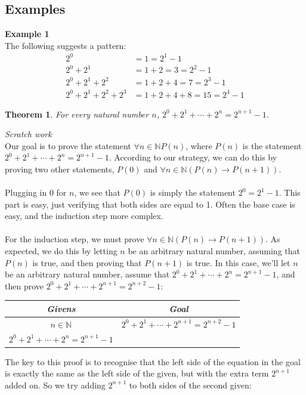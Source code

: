 \documentclass{report}
\newtheorem*{theorem}{Theorem}
\theoremstyle{definition}
\begin{document}
\subsection{Examples}
\textbf{Example 1}\\
The following suggests a pattern:
\begin{align*}
2^0&=1=2^1-1\\
2^0+2^1&=1+2=3=2^2-1\\
2^0+2^1+2^2&=1+2+4=7=2^3-1\\
2^0+2^1+2^2+2^3&=1+2+4+8=15=2^4-1
\end{align*}
\begin{theorem}
For every natural number $n$, $2^0+2^1+\cdots+2^n=2^{n+1}-1$.
\end{theorem}
\noindent\textit{Scratch work}\\
Our goal is to prove the statement $\forall n\in\mathbb NP(n)$, where $P(n)$ is the statement $2^0+2^1+\cdots+2^n=2^{n+1}-1$. According to our strategy, we can do this by proving two other
statements, $P(0)$ and $\forall n\in\mathbb N(P(n)\to P(n+1))$.\\
\vspace{1mm}\\
Plugging in 0 for $n$, we see that $P(0)$ is simply the statement $2^0=2^1-1$. This part is easy, just verifying that both sides are equal to 1. Often the base case is easy, and the induction 
step more complex.\\
\vspace{1mm}\\
For the induction step, we must prove $\forall n\in\mathbb N(P(n)\to P(n+1))$. As expected, we do this by letting $n$ be an arbitrary natural number, assuming that $P(n)$ is true, and then proving
that $P(n+1)$ is true. In this case, we'll let $n$ be an arbitrary natural number, assume that 
$2^0+2^1+\cdots+2^n=2^{n+1}-1$, and then prove $2^0+2^1+\cdots+2^{n+1}=2^{n+2}-1$:
\begin{center}
\begin{tabular}{c|c}
\textit{Givens}&\textit{Goal}\\
\hline
$n\in\mathbb N$&$2^0+2^1+\cdots+2^{n+1}=2^{n+2}-1$\\
$2^0+2^1+\cdots+2^n=2^{n+1}-1$&
\end{tabular}
\end{center}
The key to this proof is to recognise that the left side of the equation in the goal is exactly the same as the left side of the given, but with the extra term $2^{n+1}$ added on. So we try
adding $2^{n+1}$ to both sides of the second given:
\end{document}
